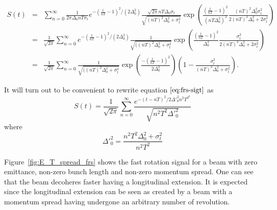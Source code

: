 {\small
\begin{eqnarray}
S(t)&=&\sum_{n=0}^\infty\frac{1}{2\pi\Delta_0nT\sigma_t}e^{-(\frac{t}{nT}-1)^2/(2\Delta_0^2)}
\frac{\sqrt{2\pi}nT\Delta_0\sigma_t}{\sqrt{(nT)^2\Delta_0^2+\sigma_t^2}}
\exp(\frac{(\frac{t}{nT}-1)^2}{(nT\Delta_0^2)^2}\frac{(nT)^2\Delta_0^2\sigma_t^2}{2(nT)^2\Delta_0^2+2\sigma_t^2})\nonumber\\
&=& \frac{1}{\sqrt{2\pi}}\sum_{n=0}^\infty e^{-(\frac{t}{nT}-1)^2/(2\Delta_0^2)}
\frac{1}{\sqrt{((nT)^2\Delta_0^2+\sigma_t^2}}
\exp(\frac{(\frac{t}{nT}-1)^2}{\Delta_0^2}\frac{\sigma_t^2}{2(nT)^2\Delta_0^2+2\sigma_t^2})\nonumber\\
&=& \frac{1}{\sqrt{2\pi}}\sum_{n=0}^\infty
\frac{1}{\sqrt{((nT)^2\Delta_0^2+\sigma_t^2}}
\exp\left(\frac{-(\frac{t}{nT}-1)^2}{2\Delta_0^2}\right)\left(1-\frac{\sigma_t^2}{(nT)^2\Delta_0^2+\sigma_t^2}\right).\label{eq:frs-sigt}
\end{eqnarray}
}

It will turn out to be convenient to rewrite equation$~\eqref{eq:frs-sigt}$ as 
\begin{equation}
S(t)=\frac{1}{\sqrt{2\pi}}\sum^{\infty}_{n=0}\frac{e^{-(t-nT)^2/2\Delta'^2_0n^2T^2^2}}{\sqrt{n^2T^2\Delta'^2_0}}
\label{eq:frs-sigtsimp}
\end{equation}
where \[\Delta'^2_0=\frac{n^2T^2\Delta^2_0+\sigma^2_t}{n^2T^2}\]

Figure~\ref{fig:E_T_spread_frs} shows the fast rotation signal for a beam with zero emittance, non-zero bunch length and non-zero momentum spread.
One can see that the beam decoheres faster having a longitudinal extension. It is expected since the longitudinal extension can be seen as created by a beam with a momentum spread having undergone an arbitrary number of revolution.

